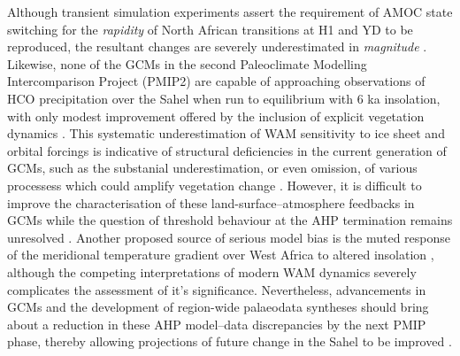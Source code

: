 \documentclass[a4paper]{article}
\begin{document}
Although transient simulation experiments assert the requirement of AMOC state switching for the \emph{rapidity} of North African transitions at H1 and YD to be reproduced, the resultant changes are severely underestimated in \emph{magnitude} \parencite{timm2010mechanisms, otto2014coherent}. 
Likewise, none of the GCMs in the second Paleoclimate Modelling Intercomparison Project (PMIP2) are capable of approaching observations of HCO precipitation over the Sahel when run to equilibrium with 6 ka insolation, with only modest improvement offered by the inclusion of explicit vegetation dynamics \parencite{braconnot2012evaluation, zheng2013characterization, harrison2015evaluation}.
This systematic underestimation of WAM sensitivity to ice sheet and orbital forcings is indicative of structural deficiencies in the current generation of GCMs, such as the substanial underestimation, or even omission, of various processess which could amplify vegetation change \parencite{harrison2015evaluation, tierney2017rainfall}.
However, it is difficult to improve the characterisation of these land-surface--atmosphere feedbacks in GCMs while the question of threshold behaviour at the AHP termination remains unresolved \parencite{claussen2017theory}. 
Another proposed source of serious model bias is the muted response of the meridional temperature gradient over West Africa to altered insolation \parencite{zheng2013characterization}, although the competing interpretations of modern WAM dynamics severely complicates the assessment of it's significance. 
Nevertheless, advancements in GCMs and the development of region-wide palaeodata syntheses should bring about a reduction in these AHP model--data discrepancies by the next PMIP phase, thereby allowing projections of future change in the Sahel to be improved \parencite{braconnot2012evaluation, harrison2015evaluation}.

\printbibliography{}
\end{document}
